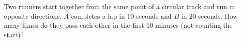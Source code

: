 Two runners start together from the same point of a circular track and run in opposite directions. $A$ completes a lap in $10$ seconds and $B$ in $20$ seconds. How many times do they pass each other in the first $10$ minutes (not counting the start)?
